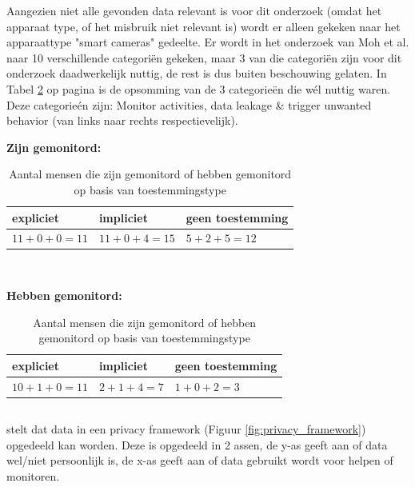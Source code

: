 \documentclass[nonacm,sigconf]{acmart}
\begin{document}
    Aangezien niet alle gevonden data relevant is voor dit onderzoek (omdat het apparaat type, of het misbruik niet relevant is) wordt er alleen gekeken naar het apparaattype "smart cameras" gedeelte.
    Er wordt in het onderzoek van Moh et al. naar 10 verschillende categoriën gekeken, maar 3 van die categoriën zijn voor dit onderzoek daadwerkelijk nuttig, de rest is dus buiten beschouwing gelaten.
    In Tabel \ref{table:moh} op pagina \pageref{table:moh} is de opsomming van de 3 categorieën die wél nuttig waren.
    Deze categorieén zijn: Monitor activities, data leakage & trigger unwanted behavior (van links naar rechts respectievelijk).

    \begin{table}[h]
        \raggedright\textbf{Zijn gemonitord:}
        \begin{tabularx}{\columnwidth}{|X|X|X|}
            \hline
            expliciet & impliciet & geen toestemming\\
            \hline
            $11+0+0 = 11$ & $11+0+4 = 15$ & $5+2+5 = 12$\\
            \hline
        \end{tabularx}
        \vspace{0.01cm}
        \\
        \raggedright\textbf{Hebben gemonitord:}
        \begin{tabularx}{\columnwidth}{|X|X|X|}
            \hline
            expliciet & impliciet & geen toestemming\\
            \hline
            $10+1+0 = 11$ & $2+1+4 = 7$ & $1+0+2 = 3$\\
            \hline
        \end{tabularx}
        \caption{Aantal mensen die zijn gemonitord of hebben gemonitord op basis van toestemmingstype \parencite{moh2023characterizing}}
       \label{table:moh}
    \end{table}

    \subsection{}
    \parencite{van2016privacy} stelt dat data in een privacy framework (Figuur \ref{fig:privacy_framework}) opgedeeld kan worden.
    Deze is opgedeeld in 2 assen, de y-as geeft aan of data wel/niet persoonlijk is, de x-as geeft aan of data gebruikt wordt voor helpen of monitoren.
\end{document}
